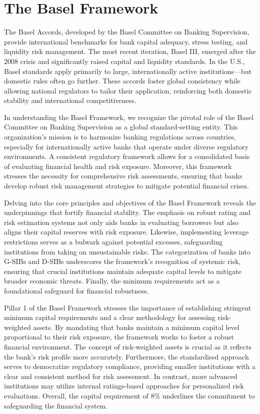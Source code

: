 \section{The Basel Framework}

The Basel Accords, developed by the Basel Committee on Banking Supervision, provide international benchmarks for bank capital adequacy, stress testing, and liquidity risk management. The most recent iteration, Basel III, emerged after the 2008 crisis and significantly raised capital and liquidity standards. In the U.S., Basel standards apply primarily to large, internationally active institutions—but domestic rules often go further. These accords foster global consistency while allowing national regulators to tailor their application, reinforcing both domestic stability and international competitiveness.

In understanding the Basel Framework, we recognize the pivotal role of the Basel Committee on Banking Supervision as a global standard-setting entity. This organization's mission is to harmonize banking regulations across countries, especially for internationally active banks that operate under diverse regulatory environments. A consistent regulatory framework allows for a consolidated basis of evaluating financial health and risk exposure. Moreover, this framework stresses the necessity for comprehensive risk assessments, ensuring that banks develop robust risk management strategies to mitigate potential financial crises.

Delving into the core principles and objectives of the Basel Framework reveals the underpinnings that fortify financial stability. The emphasis on robust rating and risk estimation systems not only aids banks in evaluating borrowers but also aligns their capital reserves with risk exposure. Likewise, implementing leverage restrictions serves as a bulwark against potential excesses, safeguarding institutions from taking on unsustainable risks. The categorization of banks into G-SIBs and D-SIBs underscores the framework's recognition of systemic risk, ensuring that crucial institutions maintain adequate capital levels to mitigate broader economic threats. Finally, the minimum requirements act as a foundational safeguard for financial robustness.

Pillar 1 of the Basel Framework stresses the importance of establishing stringent minimum capital requirements and a clear methodology for assessing risk-weighted assets. By mandating that banks maintain a minimum capital level proportional to their risk exposure, the framework works to foster a robust financial environment. The concept of risk-weighted assets is crucial as it reflects the bank's risk profile more accurately. Furthermore, the standardised approach serves to democratize regulatory compliance, providing smaller institutions with a clear and consistent method for risk assessment. In contrast, more advanced institutions may utilize internal ratings-based approaches for personalized risk evaluations. Overall, the capital requirement of 8\% underlines the commitment to safeguarding the financial system.

